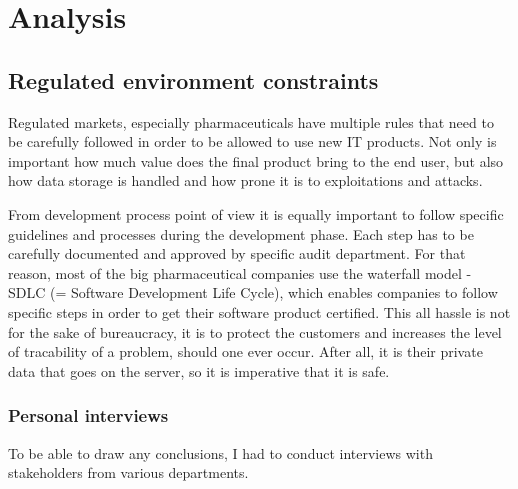 \chapter{Analysis}

\section{Regulated environment constraints}

Regulated markets, especially pharmaceuticals have multiple rules that need to be carefully followed in order to be allowed to use new IT products. Not only is important how much value does the final product bring to the end user, but also how data storage is handled and how prone it is to exploitations and attacks. 

From development process point of view it is equally important to follow specific guidelines and processes during the development phase. Each step has to be carefully documented and approved by specific audit department. For that reason, most of the big pharmaceutical companies use the waterfall model - SDLC (= Software Development Life Cycle), which enables companies to follow specific steps in order to get their software product certified. This all hassle is not for the sake of bureaucracy, it is to protect the customers and increases the level of tracability of a problem, should one ever occur. After all, it is their private data that goes on the server, so it is imperative that it is safe.

\subsection{Personal interviews}

To be able to draw any conclusions, I had to conduct interviews with stakeholders from various departments.

